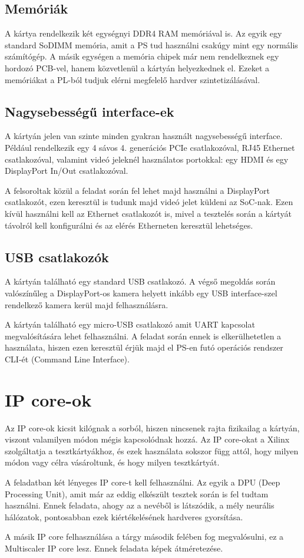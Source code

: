 \subsection{Memóriák}
A kártya rendelkezik két egységnyi DDR4 RAM memóriával is. Az egyik egy standard SoDIMM memória, amit a PS tud használni csakúgy mint egy normális számítógép. A másik egységen a memória chipek már nem rendelkeznek egy hordozó PCB-vel, hanem közvetlenül a kártyán helyezkednek el. Ezeket a memóriákat a PL-ból tudjuk elérni megfelelő hardver szintetizálásával.

\subsection{Nagysebességű interface-ek}
A kártyán jelen van szinte minden gyakran használt nagysebességű interface. Például rendelkezik egy 4 sávos 4. generációs PCIe csatlakozóval, RJ45 Ethernet csatlakozóval, valamint videó jeleknél használatos portokkal: egy HDMI és egy DisplayPort In/Out csatlakozóval.

A felsoroltak közül a feladat során fel lehet majd használni a DisplayPort csatlakozót, ezen keresztül is tudunk majd videó jelet küldeni az SoC-nak. Ezen kívül használni kell az Ethernet csatlakozót is, mivel a tesztelés során a kártyát távolról kell konfigurálni és az elérés Etherneten keresztül lehetséges.

\subsection{USB csatlakozók}
A kártyán található egy standard USB csatlakozó. A végső megoldás során valószínűleg a DisplayPort-os kamera helyett inkább egy USB interface-szel rendelkező kamera kerül majd felhasználásra.

A kártyán található egy micro-USB csatlakozó amit UART kapcsolat megvalósítására lehet felhasználni. A feladat során ennek is elkerülhetetlen a használata, hiszen ezen keresztül érjük majd el PS-en futó operációs rendszer CLI-ét (Command Line Interface).

\section{IP core-ok}
Az IP core-ok kicsit kilógnak a sorból, hiszen nincsenek rajta fizikailag a kártyán, viszont valamilyen módon mégis kapcsolódnak hozzá. Az IP core-okat a Xilinx szolgáltatja a tesztkártyákhoz, és ezek használata sokszor függ attól, hogy milyen módon vagy célra vásároltunk, és hogy milyen tesztkártyát.

A feladatban két lényeges IP core-t kell felhasználni. Az egyik a DPU (Deep Processing Unit), amit már az eddig elkészült tesztek során is fel tudtam használni. Ennek feladata, ahogy az a nevéből is látszódik, a mély neurális hálózatok, pontosabban ezek kiértékelésének hardveres gyorsítása.

A másik IP core felhasználása a tárgy második felében fog megvalósulni, ez a Multiscaler IP core lesz. Ennek feladata képek átméretezése.
